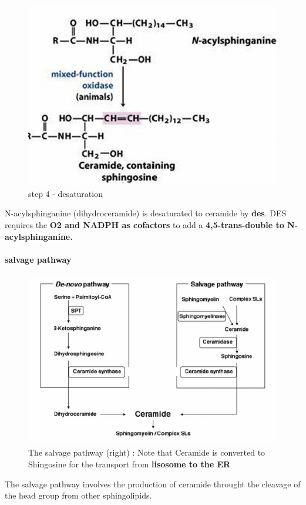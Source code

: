 \documentclass[../main.tex]{subfiles}
\begin{document}
\begin{figure}[H]
    \centering
    \includegraphics[width=0.5\linewidth]{step4S.png}
    \caption{step 4 - desaturation}
    \label{fig:enter-label}
\end{figure}
N-acylsphinganine (dihydroceramide) 
is desaturated to ceramide by \textbf{\gls{des}}. DES requires the \textbf{O2 and NADPH as cofactors} to add a\textbf{ 4,5-trans-double to  N-acylsphinganine.}


\paragraph{salvage pathway}
\begin{figure}[H]
    \centering
    \includegraphics[width=0.7\linewidth]{2pathways.png}
    \caption{The salvage pathway (right) : Note that Ceramide is converted to Shingosine for the transport from \textbf{lisosome to the ER}}
    \label{fig:enter-label}
\end{figure}
The salvage pathway involves the production of ceramide throught the cleavage of the head group from other sphingolipids.
\end{document}
